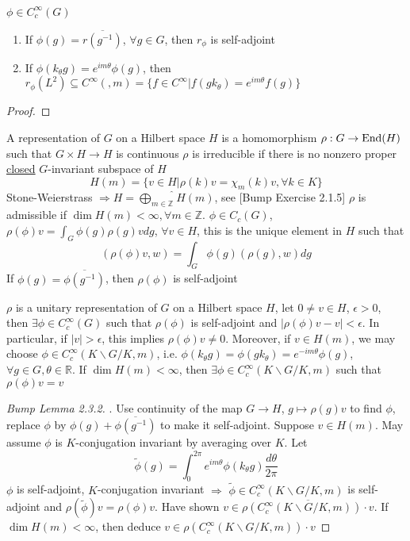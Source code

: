 \documentclass[../main.tex]{subfiles}
\begin{document}
\begin{lemma}
$\phi\in C^\infty_c(G)$
\begin{enumerate}
\item If $\phi(g)=\overline{r(g^{-1})}$, $\forall g\in G$, then $r_\phi$ is self-adjoint
\item If $\phi(k_\theta g)=e^{im\theta}\phi(g)$, then $r_\phi(L^2)\subseteq C^\infty(,m)=\{f\in C^\infty|f(gk_\theta)=e^{im\theta}f(g)\}$
\end{enumerate}
\end{lemma}

\begin{proof}

\end{proof}

\begin{definition}
A representation of $G$ on a Hilbert space $H$ is a homomorphism $\rho:G\to\operatorname{End}(H)$ such that $G\times H\to H$ is continuous
$\rho$ is irreducible if there is no nonzero proper \underline{closed} $G$-invariant subspace of $H$
\[H(m)=\{v\in H|\rho(k)v=\chi_m(k)v,\forall k\in K\}\]
Stone-Weierstrass $\Rightarrow H=\displaystyle\widehat{\bigoplus_{m\in\mathbb Z}}H(m)$, see [Bump Exercise 2.1.5]
$\rho$ is admissible if $\dim H(m)<\infty,\forall m\in\mathbb Z$. $\phi\in C_c(G)$, $\rho(\phi)v=\displaystyle\int_G\phi(g)\rho(g)vdg$, $\forall v\in H$, this is the unique element in $H$ such that
\[(\rho(\phi)v,w)=\int_G\phi(g)(\rho(g),w)dg\]
If $\phi(g)=\overline{\phi(g^{-1})}$, then $\rho(\phi)$ is self-adjoint
\end{definition}

\begin{lemma}\label{rho(phi)v=v}
$\rho$ is a unitary representation of $G$ on a Hilbert space $H$, let $0\neq v\in H$, $\epsilon>0$, then $\exists\phi\in C^\infty_c(G)$ such that $\rho(\phi)$ is self-adjoint and $|\rho(\phi)v-v|<\epsilon$. In particular, if $|v|>\epsilon$, this implies $\rho(\phi)v\neq0$. Moreover, if $v\in H(m)$, we may choose $\phi\in C_c^\infty(K\backslash G/K,m)$, i.e. $\phi(k_\theta g)=\phi(g k_\theta)=e^{-im\theta}\phi(g)$, $\forall g\in G,\theta\in\mathbb R$. If $\dim H(m)<\infty$, then $\exists\phi\in C_c^\infty(K\backslash G/K,m)$ such that $\rho(\phi)v=v$
\end{lemma}

\begin{proof}
[Bump Lemma 2.3.2]. Use continuity of the map $G\to H$, $g\mapsto\rho(g)v$ to find $\phi$, replace $\phi$ by $\phi(g)+\overline{\phi(g^{-1})}$ to make it self-adjoint. Suppose $v\in H(m)$. May assume $\phi$ is $K$-conjugation invariant by averaging over $K$. Let
\[\tilde\phi(g)=\int_0^{2\pi}e^{im\theta}\phi(k_\theta g)\frac{d\theta}{2\pi}\]
$\phi$ is self-adjoint, $K$-conjugation invariant $\Rightarrow$ $\tilde\phi\in C^\infty_c(K\backslash G/K,m)$ is self-adjoint and $\rho(\tilde\phi)v=\rho(\phi)v$. Have shown $v\in\overline{\rho(C^\infty_c(K\backslash G/K,m))\cdot v}$. If $\dim H(m)<\infty$, then deduce $v\in \rho(C^\infty_c(K\backslash G/K,m))\cdot v$
\end{proof}
\end{document}
